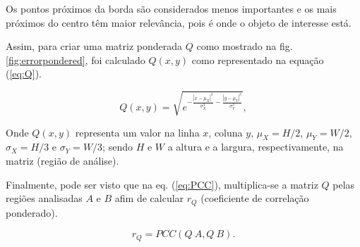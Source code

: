 Os pontos próximos da borda são considerados menos importantes e os mais próximos do centro 
têm maior relevância, pois é onde o objeto de interesse está.

Assim, para criar uma matriz ponderada $Q$ como mostrado na fig. \ref{fig:errorpondered},
foi calculado $Q(x,y)$ como representado na equação (\ref{eq:Q}).

\begin{equation}\label{eq:Q}
 Q(x,y) = \sqrt{e^{ -\frac{|x-\mu_X|^3}{\sigma_X^3}-\frac{|y-\mu_Y|^3}{\sigma_Y^3}  }},
\end{equation}

Onde $Q(x,y)$ representa um valor na linha $x$, coluna $y$,
$\mu_X=H/2$, $\mu_Y=W/2$, $\sigma_X=H/3$ e $\sigma_Y=W/3$; sendo $H$ e $W$
a altura e a largura, respectivamente, na matriz (região de análise).

Finalmente, pode ser visto que na eq. (\ref{eq:PCC}), multiplica-se a matriz $Q$ pelas 
regiões analisadas $A$ e $B$ afim de calcular $r_Q$ (coeficiente de correlação ponderado).

\begin{equation}\label{eq:rw}
 r_Q = PCC(Q~A, Q~B).
\end{equation}